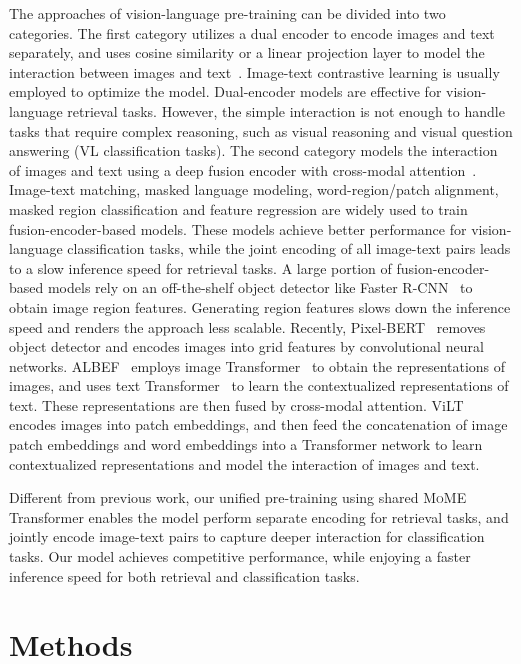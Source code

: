 \documentclass{article}
\newcommand\mome{\textsc{MoME}}
\begin{document}
The approaches of vision-language pre-training can be divided into two categories.
The first category utilizes a dual encoder to encode images and text separately, and uses cosine similarity or a linear projection layer to model the interaction between images and text~\citep{clip,align}.
Image-text contrastive learning is usually employed to optimize the model.
Dual-encoder models are effective for vision-language retrieval tasks.
However, the simple interaction is not enough to handle tasks that require complex reasoning, such as visual reasoning and visual question answering (VL classification tasks). 
The second category models the interaction of images and text using a deep fusion encoder with cross-modal attention~\citep{lxmert,vilbert,vl-bert,visualbert,unifiedvlp,uniter,oscar,unimo,villa,vinvl,pixel-bert,soho,vilt,albef,simvlm}. 
Image-text matching, masked language modeling, word-region/patch alignment, masked region classification and feature regression are widely used to train fusion-encoder-based models.
These models achieve better performance for vision-language classification tasks, while the joint encoding of all image-text pairs leads to a slow inference speed for retrieval tasks.
A large portion of fusion-encoder-based models rely on an off-the-shelf object detector like Faster R-CNN~\citep{faster-rcnn} to obtain image region features. 
Generating region features slows down the inference speed and renders the approach less scalable.
Recently, Pixel-BERT~\citep{pixel-bert} removes object detector and encodes images into grid features by convolutional neural networks.
ALBEF~\citep{albef} employs image Transformer~\citep{vit,deit} to obtain the representations of images, and uses text Transformer~\citep{bert} to learn the contextualized representations of text.
These representations are then fused by cross-modal attention.
ViLT~\citep{vilt} encodes images into patch embeddings, and then feed the concatenation of image patch embeddings and word embeddings into a Transformer network to learn contextualized representations and model the interaction of images and text.

Different from previous work, 
our unified pre-training using shared \mome{} Transformer enables the model perform separate encoding for retrieval tasks, and jointly encode image-text pairs to capture deeper interaction for classification tasks.
Our model achieves competitive performance, while enjoying a faster inference speed for both retrieval and classification tasks.


\section{Methods}
\label{sec:methods}
\end{document}
